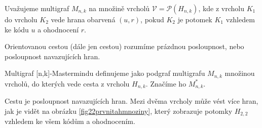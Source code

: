 \begin{definice}
  Uvažujeme multigraf $M_{n,k}$ na množině vrcholů $\mathcal{V} = \mathcal{P}(H_{n,k})$, kde z vrcholu $K_1$ do vrcholu $K_2$ vede hrana obarvená $(u,r)$, pokud $K_2$ je potomek $K_1$ vzhledem ke kódu $u$ a ohodnocení $r$.
\end{definice}

\begin{definice}
    Orientovanou cestou (dále jen cestou) rozumíme prázdnou posloupnost, nebo posloupnost navazujících hran. 
\end{definice}

\begin{definice}
  Multigraf [n,k]-Mastermindu definujeme jako podgraf multigrafu $M_{n,k}$ množinou vrcholů, do kterých vede cesta z vrcholu $H_{n,k}$. Značíme ho $M_{n,k}^*$.
  
\end{definice}

\begin{pozn}
    Cestu je posloupnost navazujících hran. Mezi dvěma vrcholy může vést více hran, jak je vidět na obrázku \ref{fig22prvnitahmnoziny}, který zobrazuje potomky $H_{2,2}$ vzhledem ke všem kódům a ohodnocením. 
\end{pozn}

